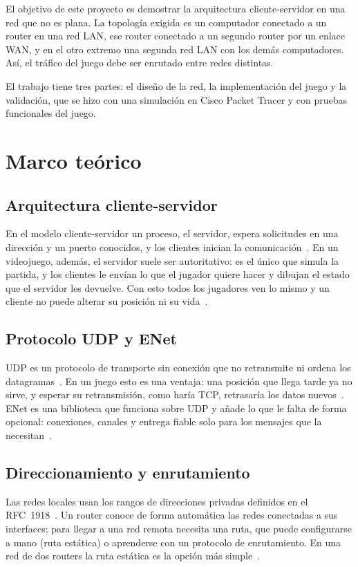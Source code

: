 \documentclass[conference]{IEEEtran}
\begin{document}
El objetivo de este proyecto es demostrar la arquitectura cliente-servidor en
una red que no es plana. La topología exigida es un computador conectado a un
router en una red LAN, ese router conectado a un segundo router por un enlace
WAN, y en el otro extremo una segunda red LAN con los demás computadores. Así,
el tráfico del juego debe ser enrutado entre redes distintas.

El trabajo tiene tres partes: el diseño de la red, la implementación del juego y
la validación, que se hizo con una simulación en Cisco Packet Tracer y con
pruebas funcionales del juego.

\section{Marco teórico}
\subsection{Arquitectura cliente-servidor}
En el modelo cliente-servidor un proceso, el servidor, espera solicitudes en una
dirección y un puerto conocidos, y los clientes inician la
comunicación~\cite{kurose}. En un videojuego, además, el servidor suele ser
autoritativo: es el único que simula la partida, y los clientes le envían lo que
el jugador quiere hacer y dibujan el estado que el servidor les devuelve. Con
esto todos los jugadores ven lo mismo y un cliente no puede alterar su posición
ni su vida~\cite{fiedler}.

\subsection{Protocolo UDP y ENet}
UDP es un protocolo de transporte sin conexión que no retransmite ni ordena los
datagramas~\cite{rfc768}. En un juego esto es una ventaja: una posición que
llega tarde ya no sirve, y esperar su retransmisión, como haría TCP, retrasaría
los datos nuevos~\cite{fiedler}. ENet es una biblioteca que funciona sobre UDP y
añade lo que le falta de forma opcional: conexiones, canales y entrega fiable
solo para los mensajes que la necesitan~\cite{enet}.

\subsection{Direccionamiento y enrutamiento}
Las redes locales usan los rangos de direcciones privadas definidos en el
RFC~1918~\cite{rfc1918}. Un router conoce de forma automática las redes
conectadas a sus interfaces; para llegar a una red remota necesita una ruta, que
puede configurarse a mano (ruta estática) o aprenderse con un protocolo de
enrutamiento. En una red de dos routers la ruta estática es la opción más
simple~\cite{kurose}.
\end{document}
